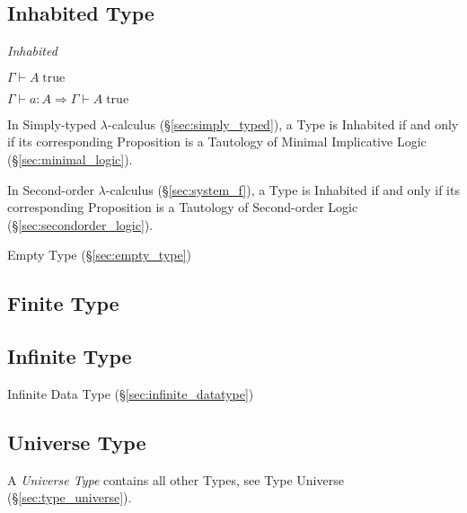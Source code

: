 \subsection{Inhabited Type}\label{sec:inhabited_type}

\emph{Inhabited}

$\Gamma \vdash A\;\mathrm{true}$

$\Gamma \vdash a:A \Rightarrow \Gamma \vdash A\;\mathrm{true}$

In Simply-typed $\lambda$-calculus (\S\ref{sec:simply_typed}), a Type
is Inhabited if and only if its corresponding Proposition is a
Tautology of Minimal Implicative Logic (\S\ref{sec:minimal_logic}).

In Second-order $\lambda$-calculus (\S\ref{sec:system_f}), a
Type is Inhabited if and only if its corresponding Proposition is a
Tautology of Second-order Logic (\S\ref{sec:secondorder_logic}).

Empty Type (\S\ref{sec:empty_type})



\subsection{Finite Type}\label{sec:finite_type}

\subsection{Infinite Type}\label{sec:infinite_type}

Infinite Data Type (\S\ref{sec:infinite_datatype})



\subsection{Universe Type}\label{sec:universe_type}

A \emph{Universe Type} contains all other Types, see Type Universe
(\S\ref{sec:type_universe}).



